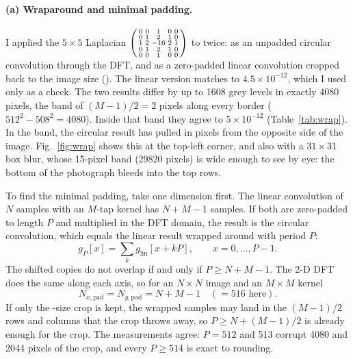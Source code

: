 \paragraph{(a) Wraparound and minimal padding.} I applied the $5\times5$
Laplacian
$\begin{psmallmatrix}0&0&1&0&0\\0&1&2&1&0\\1&2&-16&2&1\\0&1&2&1&0\\0&0&1&0&0\end{psmallmatrix}$
to  twice: as an unpadded circular convolution through the DFT,
and as a zero-padded linear convolution cropped back to the image size
(). The linear version matches
 to $4.5\times10^{-12}$, which I used only as a
check. The two results differ by up to 1608 grey levels in exactly 4080 pixels,
the band of $(M-1)/2=2$ pixels along every border ($512^2-508^2=4080$). Inside
that band they agree to $5\times10^{-12}$ (Table~\ref{tab:wrap}). In the band,
the circular result has pulled in pixels from the opposite side of the image.
Fig.~\ref{fig:wrap} shows this at the top-left corner, and also with a
$31\times31$ box blur, whose 15-pixel band (29820 pixels) is wide enough to see
by eye: the bottom of the photograph bleeds into the top rows.

To find the minimal padding, take one dimension first. The linear convolution
of $N$ samples with an $M$-tap kernel has $N+M-1$ samples. If both are
zero-padded to length $P$ and multiplied in the DFT domain, the result is the
circular convolution, which equals the linear result wrapped around with period
$P$:
\begin{equation}
g_P[x]=\sum_{k}g_\text{lin}[x+kP],\qquad x=0,\dots,P-1.
\end{equation}
The shifted copies do not overlap if and only if $P\ge N+M-1$. The 2-D DFT does
the same along each axis, so for an $N\times N$ image and an $M\times M$ kernel
\begin{equation}
N_{x,\text{pad}}=N_{y,\text{pad}}=N+M-1\quad(=516\text{ here}).
\end{equation}
If only the -size crop is kept, the wrapped samples may land in the
$(M-1)/2$ rows and columns that the crop throws away, so $P\ge N+(M-1)/2$ is
already enough for the crop. The measurements agree: $P=512$ and 513 corrupt
4080 and 2044 pixels of the crop, and every $P\ge514$ is exact to rounding.

